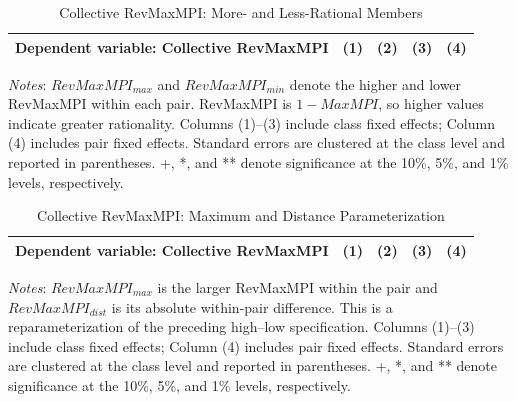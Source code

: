 \documentclass[11 pt]{article}
\begin{document}
\begin{table}[H]
\centering
\caption{Collective RevMaxMPI: More- and Less-Rational Members}
\label{tab:collective_maxmpi_highlow}
\begin{tabular}{lcccc}
\toprule
Dependent variable: Collective RevMaxMPI & (1) & (2) & (3) & (4) \\
\midrule

\end{tabular}
\begin{minipage}{\textwidth}
{\footnotesize \emph{Notes}: $RevMaxMPI_{max}$ and $RevMaxMPI_{min}$ denote the higher and lower RevMaxMPI within each pair. RevMaxMPI is $1-MaxMPI$, so higher values indicate greater rationality. Columns (1)--(3) include class fixed effects; Column (4) includes pair fixed effects. Standard errors are clustered at the class level and reported in parentheses. +, *, and ** denote significance at the 10\%, 5\%, and 1\% levels, respectively.}
\end{minipage}
\end{table}

\begin{table}[H]
\centering
\caption{Collective RevMaxMPI: Maximum and Distance Parameterization}
\label{tab:collective_maxmpi_maxdist}
\begin{tabular}{lcccc}
\toprule
Dependent variable: Collective RevMaxMPI & (1) & (2) & (3) & (4) \\
\midrule

\end{tabular}
\begin{minipage}{\textwidth}
{\footnotesize \emph{Notes}: $RevMaxMPI_{max}$ is the larger RevMaxMPI within the pair and $RevMaxMPI_{dist}$ is its absolute within-pair difference. This is a reparameterization of the preceding high--low specification. Columns (1)--(3) include class fixed effects; Column (4) includes pair fixed effects. Standard errors are clustered at the class level and reported in parentheses. +, *, and ** denote significance at the 10\%, 5\%, and 1\% levels, respectively.}
\end{minipage}
\end{table}
\end{document}
